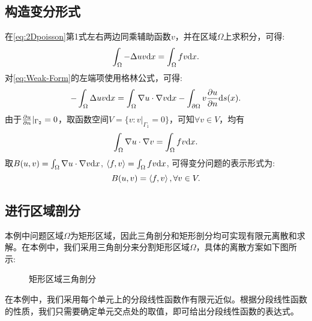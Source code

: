 \subsection{构造变分形式}
在\eqref{eq:2Dpoisson}第1式左右两边同乘辅助函数$v$，并在区域$\Omega$上求积分，可得:
\begin{equation}
    \label{eq:Weak-Form}
    \int_{\Omega}-\Delta u v\mathrm{d} x=\int_{\Omega}fv\mathrm{d} x.
\end{equation}
对\eqref{eq:Weak-Form}的左端项使用格林公式，可得:
\begin{equation}
    -\int_{\Omega}\Delta uv\mathrm{d} x=\int_{\Omega}\nabla u\cdot\nabla v\mathrm{d} x-\int_{\partial\Omega}v\frac{\partial u}{\partial n}\mathrm{d} s(x).
\end{equation}
由于$\frac{\partial u}{\partial n}|_{\Gamma_{2}}=0$，取函数空间$V=\{v:v|_{\Gamma_{1}}=0\}$，可知$\forall v\in V$，均有
\begin{equation}
    \int_{\Omega}\nabla u\cdot\nabla v=\int_{\Omega}fv\mathrm{d} x.
\end{equation}
取$B(u,v)=\int_{\Omega}\nabla u\cdot\nabla v\mathrm{d} x$, $\left<f,v\right>=\int_{\Omega}fv\mathrm{d} x$, 可得变分问题的表示形式为:
\begin{equation}
    \label{eq:variation}
    B(u,v)=\left<f,v\right>,\forall v\in V.
\end{equation}
\subsection{进行区域剖分}
本例中问题区域$\Omega$为矩形区域，因此三角剖分和矩形剖分均可实现有限元离散和求解。在本例中，我们采用三角剖分来分割矩形区域$\Omega$，具体的离散方案如下图所示:
\begin{figure}[H]
    \centering
    \caption{矩形区域三角剖分}
\end{figure}
在本例中，我们采用每个单元上的分段线性函数作有限元近似。根据分段线性函数的性质，我们只需要确定单元交点处的取值，即可给出分段线性函数的表达式。

